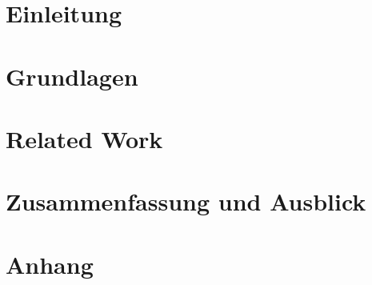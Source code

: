 
\chapter{Einleitung}
\label{chap:einleitung}


\chapter{Grundlagen}
\label{chap:grundlagen}




\chapter{Related Work}
\label{chap:related}


\chapter{Zusammenfassung und Ausblick} 
\label{chap:zus}


\appendix

\chapter{Anhang}

